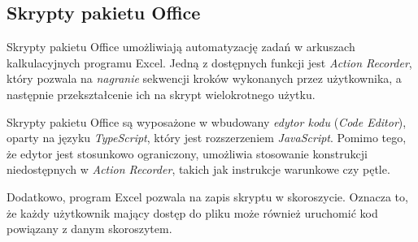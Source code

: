 \subsection{Skrypty pakietu Office \texorpdfstring{\cite{o365devx_office_2023}}{}}
Skrypty pakietu Office umożliwiają automatyzację zadań w arkuszach kalkulacyjnych programu Excel. Jedną z dostępnych funkcji jest \emph{Action Recorder}, który pozwala na \emph{nagranie} sekwencji kroków wykonanych przez użytkownika, a następnie przekształcenie ich na skrypt wielokrotnego użytku.\par
Skrypty pakietu Office są wyposażone w wbudowany \emph{edytor kodu} (\emph{Code Editor}), oparty na języku \emph{TypeScript}, który jest rozszerzeniem \emph{JavaScript}. Pomimo tego, że edytor jest stosunkowo ograniczony, umożliwia stosowanie konstrukcji niedostępnych w \emph{Action Recorder}, takich jak instrukcje warunkowe czy pętle.\par
Dodatkowo, program Excel pozwala na zapis skryptu w skoroszycie. Oznacza to, że każdy użytkownik mający dostęp do pliku może również uruchomić kod powiązany z danym skoroszytem.
